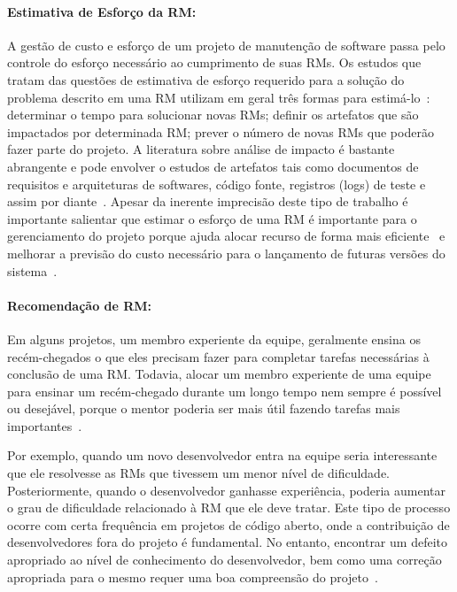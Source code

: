 \paragraph{Estimativa de Esforço da RM:} A gestão de custo e esforço de um
projeto de manutenção de software passa pelo controle do esforço necessário ao
cumprimento de suas RMs. Os estudos que tratam das questões de estimativa de
esforço requerido para a solução do problema descrito em uma RM utilizam em
geral três formas para estimá-lo~\cite{cavalcanti2014challenges}: determinar o
tempo para solucionar novas RMs; definir os artefatos que são impactados por
determinada RM\@; prever o número de novas RMs que poderão fazer parte do
projeto. A literatura sobre análise de impacto é bastante abrangente e pode
envolver o estudos de artefatos tais como documentos de requisitos e
arquiteturas de softwares, código fonte, registros (logs) de teste e assim por
diante~\cite{cavalcanti2014challenges}. Apesar da inerente imprecisão deste tipo
de trabalho é importante salientar que estimar o esforço de uma RM é importante
para o gerenciamento do projeto porque ajuda alocar recurso de forma mais
eficiente~\cite{Bhattacharya:2011:BTP:1985441.1985472} e melhorar a previsão do
custo necessário para o lançamento de futuras versões do
sistema~\cite{Vijayakumar2014}.

\paragraph{Recomendação de RM:} Em alguns projetos, um membro experiente da equipe, geralmente ensina os
recém-chegados o que eles precisam fazer para completar tarefas necessárias à
conclusão de uma RM\@. Todavia, alocar um membro experiente de uma equipe para
ensinar um recém-chegado durante um longo tempo nem sempre é possível ou
desejável, porque o mentor poderia ser mais útil fazendo tarefas mais
importantes~\cite{malheiros2012source}.

Por exemplo, quando um novo desenvolvedor entra na equipe seria
interessante que ele resolvesse as RMs que tivessem um menor nível de
dificuldade. Posteriormente, quando o desenvolvedor ganhasse experiência,
poderia aumentar o grau de dificuldade relacionado à RM que ele deve tratar.
Este tipo de processo ocorre com certa frequência em projetos de código aberto,
onde a contribuição de desenvolvedores fora do projeto é fundamental. No
entanto, encontrar um defeito apropriado ao nível de conhecimento do
desenvolvedor, bem como uma correção apropriada para o mesmo requer uma boa
compreensão do projeto~\cite{Wang2011bug}.

